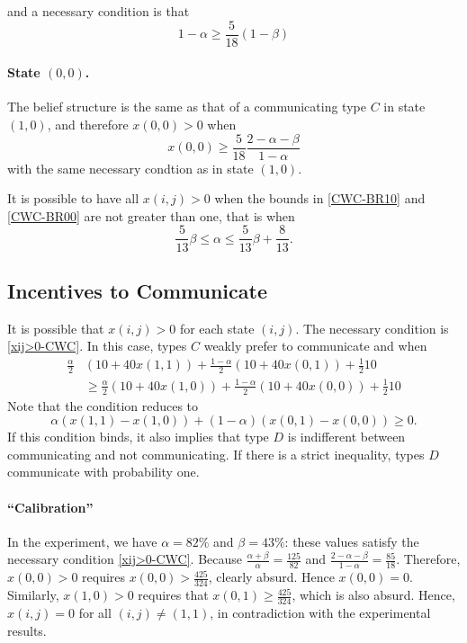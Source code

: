 \documentclass[12pt]{article}
\begin{document}
and a necessary condition is that 
\[
1-\alpha\geq \frac{5}{18}(1-\beta)
\]

%
\paragraph{State $(0,0)$.} The belief structure is the same as that of a communicating type $C$ in state $(1,0)$, and therefore $x(0,0)>0$ when
\begin{equation}\label{CWC-BR00}
	x(0,0)\geq \frac{5}{18}\frac{2-\alpha-\beta}{1-\alpha}
\end{equation}
with the same necessary condtion as in state $(1,0)$.

It is possible to have all $x(i,j)>0$ when the bounds in \eqref{CWC-BR10} and \eqref{CWC-BR00} are not greater than one, that is when
\begin{equation}\label{xij>0-CWC}
	\frac{5}{13}\beta\leq \alpha \leq \frac{5}{13}\beta+\frac{8}{13}.
\end{equation}
%
\subsection{Incentives to Communicate}
It is possible that $x(i,j)>0$ for each state $(i,j)$. The necessary condition is \eqref{xij>0-CWC}. In this case, types $C$ weakly prefer to communicate and when
\begin{equation}\label{IC-comm-CWC}
	\begin{split}
	\frac{\alpha}{2}& (10+40x(1,1))+\frac{1-\alpha}{2}(10+40x(0,1))+\frac{1}{2}10\\ 
	&\geq \frac{\alpha}{2} (10+40x(1,0))+\frac{1-\alpha}{2}(10+40x(0,0))+\frac{1}{2}10
	\end{split}
\end{equation}
Note that the condition reduces to
\begin{equation}\label{CWC-NC-a,b>0}
	\alpha (x(1,1)-x(1,0))+(1-\alpha)(x(0,1)-x(0,0))\geq 0.
\end{equation}
%
If this condition binds, it also implies that type $D$ is indifferent between communicating and not communicating. If there is a strict inequality, types $D$ communicate with probability one.



\paragraph{``Calibration''}
In the experiment, we have $\alpha=82\%$ and $\beta=43\%$: these values satisfy the necessary condition \eqref{xij>0-CWC}. Because $\frac{\alpha+\beta}{\alpha}=\frac{125}{82}$ and $\frac{2-\alpha-\beta}{1-\alpha}= \frac{85}{18}$. Therefore, $x(0,0)>0$  requires $x(0,0)>\frac{425}{324}$, clearly absurd. Hence $x(0,0)=0$. Similarly, $x(1,0)>0$ requires that $x(0,1)\geq \frac{425}{324}$, which is also absurd. Hence, $x(i,j)=0$ for all $(i,j)\neq (1,1)$, in contradiction with the experimental results.
\end{document}
